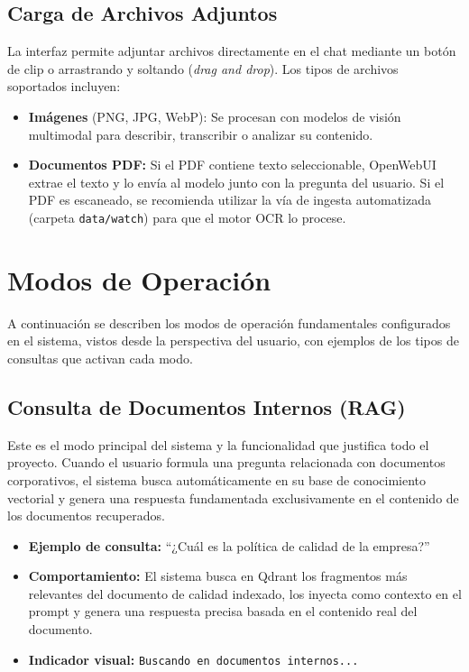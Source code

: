\subsection{Carga de Archivos Adjuntos}

La interfaz permite adjuntar archivos directamente en el chat mediante un botón de clip o arrastrando y soltando (\textit{drag and drop}). Los tipos de archivos soportados incluyen:

\begin{itemize}
    \item \textbf{Imágenes} (PNG, JPG, WebP): Se procesan con modelos de visión multimodal para describir, transcribir o analizar su contenido.
    \item \textbf{Documentos PDF:} Si el PDF contiene texto seleccionable, OpenWebUI extrae el texto y lo envía al modelo junto con la pregunta del usuario. Si el PDF es escaneado, se recomienda utilizar la vía de ingesta automatizada (carpeta \texttt{data/watch}) para que el motor OCR lo procese.
\end{itemize}

\section{Modos de Operación}
\label{sec:modos}

A continuación se describen los modos de operación fundamentales configurados en el sistema, vistos desde la perspectiva del usuario, con ejemplos de los tipos de consultas que activan cada modo.

\subsection{Consulta de Documentos Internos (RAG)}
\label{subsec:modo-rag}

Este es el modo principal del sistema y la funcionalidad que justifica todo el proyecto. Cuando el usuario formula una pregunta relacionada con documentos corporativos, el sistema busca automáticamente en su base de conocimiento vectorial y genera una respuesta fundamentada exclusivamente en el contenido de los documentos recuperados.

\begin{itemize}
    \item \textbf{Ejemplo de consulta:} ``¿Cuál es la política de calidad de la empresa?''
    \item \textbf{Comportamiento:} El sistema busca en Qdrant los fragmentos más relevantes del documento de calidad indexado, los inyecta como contexto en el prompt y genera una respuesta precisa basada en el contenido real del documento.
    \item \textbf{Indicador visual:}  \texttt{Buscando en documentos internos...}
\end{itemize}

